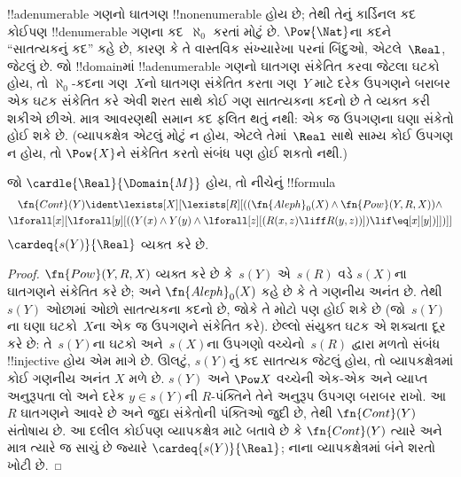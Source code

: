 \documentclass[../../../include/open-logic-section]{subfiles}
\begin{document}
\begin{explain}
!!a{denumerable} ગણનો ઘાતગણ !!{nonenumerable} હોય છે;
તેથી તેનું કાર્ડિનલ કદ કોઈપણ !!{denumerable} ગણના કદ~$\aleph_0$
કરતાં મોટું છે. $\Pow{\Nat}$ના કદને ``સાતત્યકનું કદ'' કહે છે,
કારણ કે તે વાસ્તવિક સંખ્યારેખા પરનાં બિંદુઓ, એટલે~$\Real$, જેટલું
છે. જો !!{domain}માં !!a{denumerable} ગણનો ઘાતગણ સંકેતિત
કરવા જેટલા ઘટકો હોય, તો $\aleph_0$-કદના ગણ~$X$નો ઘાતગણ
સંકેતિત કરતા ગણ~$Y$ માટે દરેક ઉપગણને બરાબર એક ઘટક સંકેતિત
કરે એવી શરત સાથે કોઈ ગણ સાતત્યકના કદનો છે તે વ્યક્ત કરી શકીએ
છીએ. માત્ર આવરણથી સમાન કદ ફલિત થતું નથી: એક જ ઉપગણના ઘણા
સંકેતો હોઈ શકે છે. (વ્યાપકક્ષેત્ર એટલું
મોટું ન હોય, એટલે તેમાં~$\Real$ સાથે સામ્ય કોઈ ઉપગણ ન હોય, તો
$\Pow{X}$ને સંકેતિત કરતો સંબંધ પણ હોઈ શકતો નથી.)
\end{explain}

\begin{prop}
જો $\cardle{\Real}{\Domain{M}}$ હોય, તો નીચેનું !!{formula}
\begin{multline*}
\fn{Cont}(Y) \ident
\lexists[X][\lexists[R][((\fn{Aleph}_0(X) \land
      \fn{Pow}(Y, R, X)) \land \\ 
      \lforall[x][\lforall[y][((Y(x) \land {}
      Y(y) \land \lforall[z][(R(x,z) \liff R(y,z))]) \lif \eq[x][y])]])]]
\end{multline*}
$\cardeq{s(Y)}{\Real}$ વ્યક્ત કરે છે.
\end{prop}

\begin{proof}
$\fn{Pow}(Y, R, X)$ વ્યક્ત કરે છે કે~$s(Y)$ એ~$s(R)$ વડે
$s(X)$ના ઘાતગણને સંકેતિત કરે છે; અને
$\fn{Aleph}_0(X)$ કહે છે કે તે ગણનીય અનંત છે. તેથી~$s(Y)$
ઓછામાં ઓછો સાતત્યકના કદનો છે, જોકે તે મોટો પણ હોઈ શકે છે
(જો~$s(Y)$ના ઘણા ઘટકો~$X$ના એક જ ઉપગણને સંકેતિત કરે).
છેલ્લો સંયુક્ત ઘટક એ શક્યતા દૂર કરે છે: તે~$s(Y)$ના ઘટકો અને~$s(X)$ના
ઉપગણો વચ્ચેનો~$s(R)$ દ્વારા મળતો સંબંધ !!{injective} હોય એમ માગે છે.
ઊલટું, $s(Y)$નું કદ સાતત્યક જેટલું હોય, તો વ્યાપકક્ષેત્રમાં
કોઈ ગણનીય અનંત $X$ મળે છે. $s(Y)$ અને $\Pow X$ વચ્ચેની
એક-એક અને વ્યાપ્ત અનુરૂપતા લો અને દરેક $y\in s(Y)$ની $R$-પંક્તિને
તેને અનુરૂપ ઉપગણ બરાબર રાખો. આ $R$ ઘાતગણને આવરે છે અને
જુદા સંકેતોની પંક્તિઓ જુદી છે, તેથી $\fn{Cont}(Y)$ સંતોષાય છે.
આ દલીલ કોઈપણ વ્યાપકક્ષેત્ર માટે બતાવે છે કે $\fn{Cont}(Y)$
ત્યારે અને માત્ર ત્યારે જ સાચું છે જ્યારે $\cardeq{s(Y)}{\Real}$;
નાના વ્યાપકક્ષેત્રમાં બંને શરતો ખોટી છે.
\end{proof}
\end{document}
